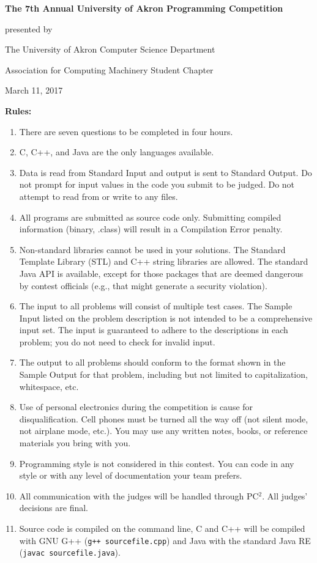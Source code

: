 \begin{center}
\large
\textbf{The 7th Annual University of Akron Programming Competition}

\vspace{.25in}

presented by

The University of Akron Computer Science Department

Association for Computing Machinery Student Chapter

\vspace{.25in}

March 11, 2017
\end{center}

\textbf{Rules:}
\begin{enumerate} \itemsep10pt \parskip0pt 
\item There are seven questions to be completed in four hours.
\item C, C++, and Java are the only languages available.
\item Data is read from Standard Input and output is sent to Standard Output. Do not prompt for input values in the code you submit to be judged. Do not attempt to read from or write to any files.
\item All programs are submitted as source code only. Submitting compiled information (binary, .class) will result in a Compilation Error penalty.
\item Non-standard libraries cannot be used in your solutions. The Standard Template Library (STL) and C++ string libraries are allowed. The standard Java API is available, except for those packages that are deemed dangerous by contest officials (e.g., that might generate a security violation).
\item The input to all problems will consist of multiple test cases. The Sample Input listed on the problem description is not intended to be a comprehensive input set. The input is guaranteed to adhere to the descriptions in each problem; you do not need to check for invalid input.
\item The output to all problems should conform to the format shown in the Sample Output for that problem, including but not limited to capitalization, whitespace, etc.
\item Use of personal electronics during the competition is cause for disqualification. Cell phones must be turned all the way off (not silent mode, not airplane mode, etc.). You may use any written notes, books, or reference materials you bring with you.
\item Programming style is not considered in this contest. You can code in any style or with any level of documentation your team prefers.
\item All communication with the judges will be handled through PC$^2$. All judges’ decisions are final.
\item Source code is compiled on the command line, C and C++ will be compiled with GNU G++ (\texttt{g++ sourcefile.cpp}) and Java with the standard Java RE (\texttt{javac sourcefile.java}).
\end{enumerate}
